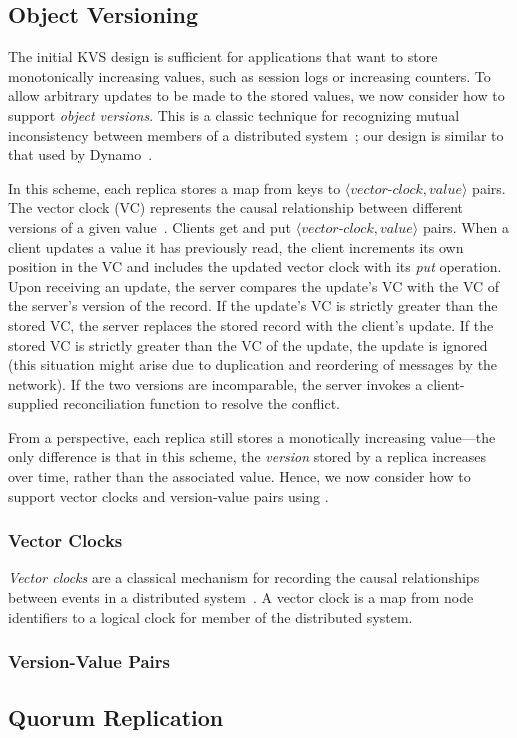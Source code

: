 \subsection{Object Versioning}
\label{sec:kvs-versions}

The initial KVS design is sufficient for applications that want to store
monotonically increasing values, such as session logs or increasing counters. To
allow arbitrary updates to be made to the stored values, we now consider how to
support \emph{object versions}. This is a classic technique for recognizing
mutual inconsistency between members of a distributed system~\cite{Parker1983};
our design is similar to that used by Dynamo~\cite{DeCandia2007}.

In this scheme, each replica stores a map from keys to
$\langle\textit{vector-clock},\textit{value}\rangle$ pairs. The vector clock
(VC) represents the causal relationship between different versions of a given
value~\cite{Fidge1988,Mattern1989}. Clients get and put
$\langle\textit{vector-clock},\textit{value}\rangle$ pairs. When a client
updates a value it has previously read, the client increments its own position
in the VC and includes the updated vector clock with its \emph{put}
operation. Upon receiving an update, the server compares the update's VC with
the VC of the server's version of the record. If the update's VC is strictly
greater than the stored VC, the server replaces the stored record with the
client's update. If the stored VC is strictly greater than the VC of the update,
the update is ignored (this situation might arise due to duplication and
reordering of messages by the network). If the two versions are incomparable,
the server invokes a client-supplied reconciliation function to resolve the
conflict.

From a \lang perspective, each replica still stores a monotically increasing
value---the only difference is that in this scheme, the \emph{version} stored by
a replica increases over time, rather than the associated value. Hence, we now
consider how to support vector clocks and version-value pairs using \lang.

\subsubsection{Vector Clocks}
\emph{Vector clocks} are a classical mechanism for recording the causal
relationships between events in a distributed
system~\cite{Fidge1988,Mattern1989}.  A vector clock is a map from node
identifiers to a logical clock for member of the distributed system.

\subsubsection{Version-Value Pairs}

\subsection{Quorum Replication}
